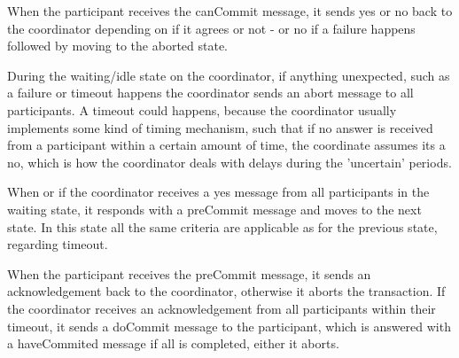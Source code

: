 \documentclass[10pt,a4paper]{article}
\begin{document}
When the participant receives the canCommit message, it sends yes or no back to the coordinator depending on if it agrees or not - or no if a failure happens followed by moving to the aborted state. 
\newline

During the waiting/idle state on the coordinator, if anything unexpected, such as a failure or timeout happens the coordinator sends an abort message to all participants. A timeout could happens, because the coordinator usually implements some kind of timing mechanism, such that if no answer is received from a participant within a certain amount of time, the coordinate assumes its a no, which is how the coordinator deals with delays during the 'uncertain' periods.
\newline

When or if the coordinator receives a yes message from all participants in the waiting state, it responds with a preCommit message and moves to the next state. In this state all the same criteria are applicable as for the previous state, regarding timeout.
\newline

When the participant receives the preCommit message, it sends an acknowledgement back to the coordinator, otherwise it aborts the transaction. If the coordinator receives an acknowledgement from all participants within their timeout, it sends a doCommit message to the participant, which is answered with a haveCommited message if all is completed, either it aborts.
\end{document}
